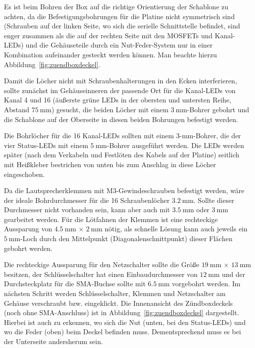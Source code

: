 \documentclass[paper=a4, parskip, numbers=noenddot, toc=listof, headsepline]{scrbook}
\begin{document}
				Es ist beim Bohren der Box auf die richtige Orientierung der Schablone zu achten, da die Befestigungsbohrungen für die Platine nicht symmetrisch sind (Schrauben auf der linken Seite, wo sich die serielle Schnittstelle befindet, sind enger zusammen als die auf der rechten Seite mit den MOSFETs und Kanal-LEDs) und die Gehäuseteile durch ein Nut-Feder-System nur in einer Kombination aufeinander gesteckt werden können. Man beachte hierzu Abbildung~\ref{fig:zuendboxdeckel}.

				Damit die Löcher nicht mit Schraubenhalterungen in den Ecken interferieren, sollte zunächst im Gehäuseinneren der passende Ort für die Kanal-LEDs von Kanal 4 und 16 (äußerste grüne LEDs in der obersten und untersten Reihe, Abstand $\SI{75}{\milli\metre}$) gesucht, die beiden Löcher mit einem $\SI{3}{\milli\metre}$-Bohrer gebohrt und die Schablone auf der Oberseite in diesen beiden Bohrungen befestigt werden.

				Die Bohrlöcher für die 16 Kanal-LEDs sollten mit einem 3-mm-Bohrer, die der vier Status-LEDs mit einem $\SI{5}{\milli\metre}$-Bohrer ausgeführt werden. Die LEDs werden später (nach dem Verkabeln und Festlöten des Kabels auf der Platine) seitlich mit Heißkleber bestrichen von unten bis zum Anschlag in diese Löcher eingeschoben.

				Da die Lautsprecherklemmen mit M3-Gewindeschrauben befestigt werden, wäre der ideale Bohrdurchmesser für die 16 Schraubenlöcher $\SI{3,2}{\milli\metre}$. Sollte dieser Durchmesser nicht vorhanden sein, kann aber auch mit $\SI{3,5}{\milli\metre}$ oder $\SI{3}{\milli\metre}$ gearbeitet werden. Für die Lötfahnen der Klemmen ist eine rechteckige Aussparung von $\SI{4,5}{\milli\metre}\,\times\,\SI{2}{\milli\metre}$ nötig, als schnelle Lösung kann auch jeweils ein $\SI{5}{\milli\metre}$-Loch durch den Mittelpunkt (Diagonalenschnittpunkt) dieser Flächen gebohrt werden.

				Die rechteckige Aussparung für den Netzschalter sollte die Größe $\SI{19}{\milli\metre}\,\times\,\SI{13}{\milli\metre}$ besitzen, der Schlüsselschalter hat einen Einbaudurchmesser von $\SI{12}{\milli\metre}$ und der Durchsteckplatz für die SMA-Buchse sollte mit $\SI{6,5}{\milli\metre}$ vorgebohrt werden. Im nächsten Schritt werden Schlüsselschalter, Klemmen und Netzschalter am Gehäuse verschraubt bzw. eingeklickt. Die Innenansicht des Zündboxdeckels (noch ohne SMA-Anschluss) ist in Abbildung~\ref{fig:zuendboxdeckel} dargestellt. Hierbei ist auch zu erkennen, wo sich die Nut (unten, bei den Status-LEDs) und wo die Feder (oben) beim Deckel befinden muss. Dementsprechend muss es bei der Unterseite andersherum sein.
\end{document}
